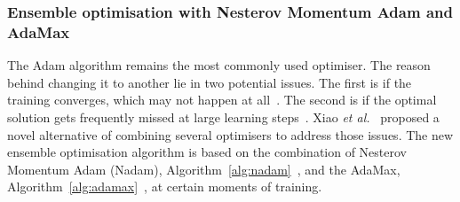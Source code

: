 %
\subsubsection{Ensemble optimisation with Nesterov Momentum Adam and AdaMax}
The Adam algorithm remains the most commonly used optimiser.
The reason behind changing it to another lie in two potential issues.
The first is if the training converges, which may not happen at all~\cite{reddi_convergence_2019}.
The second is if the optimal solution gets frequently missed at large learning steps~\cite{wilson_marginal_2017}.
Xiao \textit{et al.}~\cite{xiao_accurate_2019} proposed a novel alternative of combining several optimisers to address those issues.
The new ensemble optimisation algorithm is based on the combination of Nesterov Momentum Adam (Nadam), \mbox{Algorithm~\ref{alg:nadam}}~\cite{dozat_nadam_2016}, and the AdaMax, \mbox{Algorithm~\ref{alg:adamax}}~\cite{kingma_adam_2017}, at certain moments of training.

